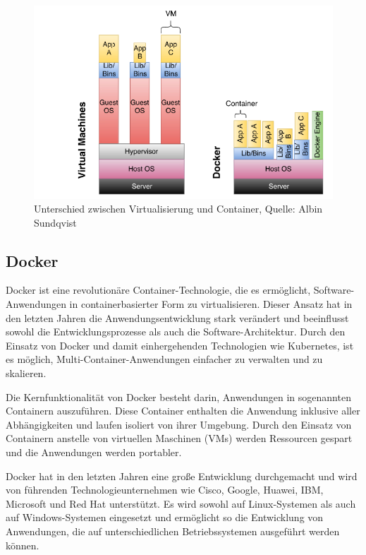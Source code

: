 \begin{figure}[h]
	\includegraphics[width=\columnwidth]{gfx/vm vs container.png} %
	\caption{Unterschied zwischen Virtualisierung und Container, Quelle: Albin Sundqvist \cite{sundqvist2020guidelines}}
\end{figure}

\subsection{Docker}

Docker ist eine revolutionäre Container-Technologie, die es ermöglicht, Software-Anwendungen in containerbasierter Form zu virtualisieren. Dieser Ansatz hat in den letzten Jahren die Anwendungsentwicklung stark verändert und beeinflusst sowohl die Entwicklungsprozesse als auch die Software-Architektur. Durch den Einsatz von Docker und damit einhergehenden Technologien wie Kubernetes, ist es möglich, Multi-Container-Anwendungen einfacher zu verwalten und zu skalieren.

Die Kernfunktionalität von Docker besteht darin, Anwendungen in sogenannten Containern auszuführen. Diese Container enthalten die Anwendung inklusive aller Abhängigkeiten und laufen isoliert von ihrer Umgebung. Durch den Einsatz von Containern anstelle von virtuellen Maschinen (VMs) werden Ressourcen gespart und die Anwendungen werden portabler.

Docker hat in den letzten Jahren eine große Entwicklung durchgemacht und wird von führenden Technologieunternehmen wie Cisco, Google, Huawei, IBM, Microsoft und Red Hat unterstützt. Es wird sowohl auf Linux-Systemen als auch auf Windows-Systemen eingesetzt und ermöglicht so die Entwicklung von Anwendungen, die auf unterschiedlichen Betriebssystemen ausgeführt werden können.

